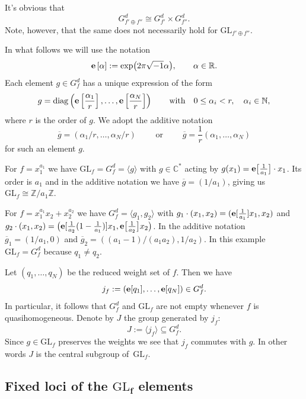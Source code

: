 \documentclass[pdftex]{sigma}
\numberwithin{equation}{section}
\newcommand{\CC}{{\mathbb{C}}}
\newcommand{\RR}{{\mathbb{R}}}
\newcommand{\ZZ}{{\mathbb{Z}}}
\newcommand{\NN}{{\mathbb{N}}}
\newcommand{\GL}{{\mathrm{GL}}}
\newcommand{\epi}{{\bf e}}
\begin{document}
It's obvious that
\begin{equation}\label{eq: full symmetry group of oplus}
	G_{f' \oplus f''}^d \cong G_{f'}^d \times G_{f''}^d.
\end{equation}
Note, however, that the same does not necessarily hold for $\GL_{f' \oplus f''}$.

In what follows we will use the notation
\[
\epi\left[\alpha\right] := \exp\bigl(2 \pi \sqrt{-1} \alpha\bigr), \qquad \alpha \in \RR.
\]
Each element $g\in G_f^d$ has a unique expression of the form
\begin{equation*}%
g={\rm diag}\left(\epi\left[\frac{\alpha_1}{r}\right], \dots,\epi\left[\frac{\alpha_N}{r}\right]\right)
\qquad \mbox{with}\quad 0 \leq \alpha_i < r,\quad \alpha_i\in\NN,
\end{equation*}
where $r$ is the order of $g$. We adopt the additive notation
\[
{\overline g = (\alpha_1/r,\dots, \alpha_N/r)} \qquad \text{ or } \qquad
{\overline g = \frac{1}{r}(\alpha_1,\dots, \alpha_N) }
\]
for such an element $g$.

\begin{Example}
For $f = x_1^{a_1}$	we have $\GL_f = G_f^d = \langle g \rangle $ with $g \in \CC^\ast$ acting by $g(x_1) = \epi\bigl[\frac{1}{a_1}\bigr] \cdot x_1$. Its order is $a_1$ and in the additive notation we have $\overline g = (1/a_1)$, giving us $\GL_f \cong \ZZ / a_1 \ZZ$.
\end{Example}
\begin{Example}\label{example: symmetry group chain2}
For $f = x_1^{a_1}x_2 + x_2^{a_2}$ we have $G_f^d = \langle g_1, g_2 \rangle$ with $g_1 \cdot (x_1,x_2) = (\epi[\frac{1}{a_1}] x_1, x_2)$ and ${ g_2 \cdot (x_1,x_2) = \bigl(\epi[\frac{1}{a_2}(1 - \frac{1}{a_1})]x_1, \epi\bigl[\frac{1}{a_2}\bigr]x_2\bigr)}$. In the additive notation $\overline g_1 = (1/a_1, 0)$ and $\overline g_2 = ((a_1 - 1)/(a_1a_2), 1/a_2)$.
In this example $\GL_f = G_f^d$ because $q_1 \neq q_2$.
\end{Example}

Let $(q_1,\dots,q_N)$ be the reduced weight set of $f$. Then we have
\[
	j_f:= (\epi[q_1],\dots, \epi[q_N]) \in G_f^d.
\]
In particular, it follows that $G_f^d$ and $\GL_f$ are not empty whenever $f$ is quasihomogeneous.
Denote by $J$ the group generated by $j_f$:
\[
	J := \langle j_f \rangle \subseteq G_f^d.
\]
Since $g\in \GL_f$ preserves the weights we see that $j_f$ commutes with $g$. In other words $J$ is the central subgroup of~$\GL_f$.

\subsection[Fixed loci of the GL\_f elements]{Fixed loci of the $\boldsymbol{\GL_f}$ elements}
\end{document}
